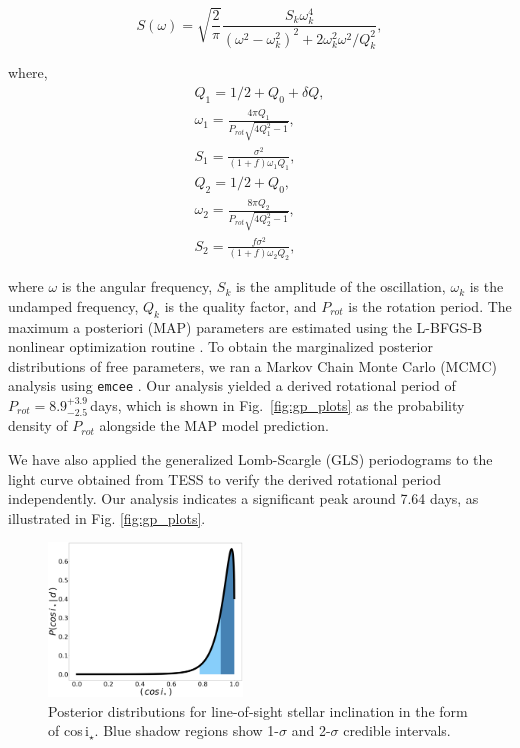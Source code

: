 \documentclass[traditabstract,longauth]{aa}
\begin{document}
\begin{equation}\label{eq_rot}
      S(\omega) = \sqrt{\frac{2}{\pi}}
         {\frac{S_{k}\omega^4_{k}}{(\omega^2-\omega^2_{k})^2+2\omega^2_{k}\omega^2/Q^2_k}},
   \end{equation}

\noindent
where, 
\begin{align}
      Q_1 = 1/2 + Q_0 + {\delta}Q, \\
      \omega_{1} = \frac{4{\pi}Q_1}{P_{rot}\sqrt{4Q^2_1-1}}, \\
      S_1 = \frac{\sigma^2}{(1+f)\omega_1Q_1}, \\
      Q_2 = 1/2 + Q_0, \\
      \omega_{2} = \frac{8{\pi}Q_2}{P_{rot}\sqrt{4Q^2_2-1}}, \\
      S_2 = \frac{f\sigma^2}{(1+f)\omega_2Q_2},
   \end{align}

where $\omega$ is the angular frequency, $S_k$ is the amplitude of the oscillation, $\omega_k$ is the undamped frequency, $Q_k$ is the quality factor, and $P_{rot}$ is the rotation period. The maximum a posteriori (MAP) parameters are estimated using the L-BFGS-B nonlinear optimization routine \citep{Byrd95,Zhu97}. To obtain the marginalized posterior distributions of free parameters, we ran a Markov Chain Monte Carlo (MCMC) analysis using {\tt emcee} \citep{Goodman10,Foreman13}. Our analysis yielded a derived rotational period of $P_{rot}=8.9_{-2.5}^{+3.9}$\,days, which is shown in Fig.~\ref{fig:gp_plots} as the probability density of $P_{rot}$ alongside the MAP model prediction.

We have also applied the generalized Lomb-Scargle (GLS) periodograms \citep{Zechmeister09} to the light curve obtained from TESS to verify the derived rotational period independently. Our analysis indicates a significant peak around 7.64 days, as illustrated in Fig. \ref{fig:gp_plots}.

\begin{figure}
\centering
\includegraphics[width=0.46\textwidth, trim= {0.0cm 0.0cm 0.0cm 0.0cm}]{figures/inclination.png}
\caption{Posterior distributions for line-of-sight stellar inclination in the form of cos\,i$_{\star}$. Blue shadow regions show 1-$\sigma$ and 2-$\sigma$ credible intervals.} \label{fig:inclination}
\end{figure}
\end{document}
